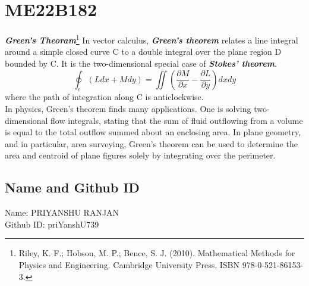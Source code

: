 \section{ME22B182}
 \textbf{\textit{Green's Theoram}}\footnote{ Riley, K. F.; Hobson, M. P.; Bence, S. J. (2010). Mathematical Methods for Physics and Engineering. Cambridge University Press. ISBN 978-0-521-86153-3.}
In vector calculus, \textbf{\textit{Green's theorem}} relates a line integral around a simple closed curve C to a double integral over the plane region D bounded by C. It is the two-dimensional special case of \textbf{\textit{Stokes' theorem}}.
\begin{equation} 
\oint_c(L dx + M dy)= \iint (\frac{\partial M}{\partial x} - \frac{\partial L}{\partial y})dx dy
\end{equation}
where the path of integration along C is anticlockwise.\\
In physics, Green's theorem finds many applications. One is solving two-dimensional flow integrals, stating that the sum of fluid outflowing from a volume is equal to the total outflow summed about an enclosing area. In plane geometry, and in particular, area surveying, Green's theorem can be used to determine the area and centroid of plane figures solely by integrating over the perimeter.

\subsection{Name and Github ID}

Name: PRIYANSHU RANJAN\\
Github ID: priYanshU739
